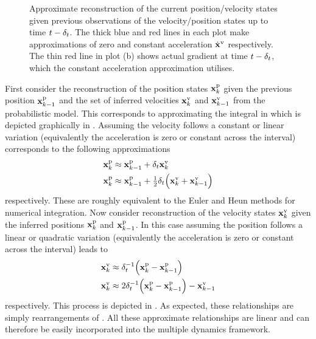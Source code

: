 \begin{figure}
{
\label{fig:veldiff}
}
%
\caption{Approximate reconstruction of the current position/velocity states given previous observations of the velocity/position states up to time $t-\delta_t$. The thick blue and red lines in each plot make approximations of zero and constant acceleration $\dot{\mathbf{x}}^{\text{v}}$ respectively. The thin red line in plot (b) shows actual gradient at time $t-\delta_t$, which the constant acceleration approximation utilises.}
\end{figure}


First consider the reconstruction of the position states $\mathbf{x}^{\text{p}}_k$ given the previous position $\mathbf{x}^{\text{p}}_{k-1}$ and the set of inferred velocities $\mathbf{x}^{\text{v}}_k$ and $\mathbf{x}^{\text{v}}_{k-1}$ from the probabilistic model. This corresponds to approximating the integral in  which is depicted graphically in . Assuming the velocity follows a constant or linear variation (equivalently the acceleration is zero or constant across the interval) corresponds to the following approximations
\begin{align}
\mathbf{x}^{\text{p}}_k &\approx \mathbf{x}^{\text{p}}_{k-1} + \delta_t\mathbf{x}^{\text{v}}_k \label{eqn:int1} \\
\mathbf{x}^{\text{p}}_k &\approx \mathbf{x}^{\text{p}}_{k-1} + \tfrac{1}{2} \delta_t \Big( \mathbf{x}^{\text{v}}_k + \mathbf{x}^{\text{v}}_{k-1} \Big) \label{eqn:int2}
\end{align}
respectively. These are roughly equivalent to the Euler and Heun methods for numerical integration. Now consider reconstruction of the velocity states $\mathbf{x}^{\text{v}}_k$ given the inferred positions $\mathbf{x}^{\text{p}}_k$ and $\mathbf{x}^{\text{p}}_{k-1}$. In this case assuming the position follows a linear or quadratic variation (equivalently the acceleration is zero or constant across the interval) leads to
\begin{align}
\mathbf{x}^{\text{v}}_k &\approx \delta_t^{-1} \Big( \mathbf{x}^{\text{p}}_k - \mathbf{x}^{\text{p}}_{k-1} \Big) \label{eqn:diff1} \\
\mathbf{x}^{\text{v}}_k &\approx 2 \delta_t^{-1} \Big( \mathbf{x}^{\text{p}}_k - \mathbf{x}^{\text{p}}_{k-1} \Big) - \mathbf{x}^{\text{v}}_{k-1} \label{eqn:diff2}
\end{align}
respectively. This process is depicted in . As expected, these relationships are simply rearrangements of . All these approximate relationships are linear and can therefore be easily incorporated into the multiple dynamics framework.






